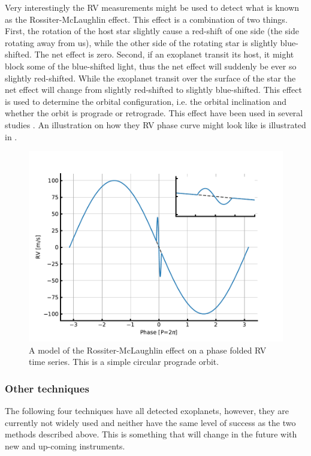 Very interestingly the RV measurements might be used to detect what is known as the
Rossiter-McLaughlin effect. This effect is a combination of two things. First, the rotation of the
host star slightly cause a red-shift of one side (the side rotating away from us), while the other
side of the rotating star is slightly blue-shifted. The net effect is zero. Second, if an exoplanet
transit its host, it might block some of the blue-shifted light, thus the net effect will suddenly
be ever so slightly red-shifted. While the exoplanet transit over the surface of the star the net
effect will change from slightly red-shifted to slightly blue-shifted. This effect is used to
determine the orbital configuration, i.e. the orbital inclination and whether the orbit is prograde
or retrograde. This effect have been used in several studies \citep[][to mention just a
few]{Winn2005,Triaud2010}. An illustration on how they RV phase curve might look like is illustrated
in .

\begin{figure}[htpb!]
    \centering
    \includegraphics[width=1.0\linewidth]{figures/RMeffect.pdf}
    \caption{A model of the Rossiter-McLaughlin effect on a phase folded RV time series. This is a
             simple circular prograde orbit.}
    \label{fig:RMeffect}
\end{figure}

\subsubsection{Other techniques}

The following four techniques have all detected exoplanets, however, they are currently not widely
used and neither have the same level of success as the two methods described above. This is
something that will change in the future with new and up-coming instruments.

